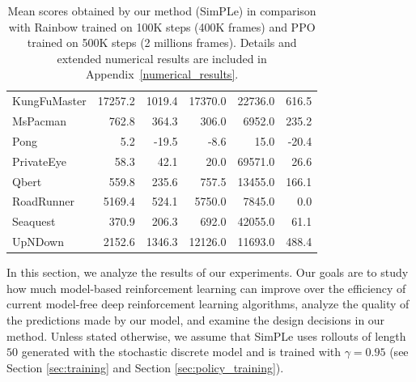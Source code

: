 \begin{table}
\begin{tabular}{l|r|r|r|r|r}
KungFuMaster   &  17257.2 &   1019.4 &  17370.0 &  22736.0 &   616.5 \\
MsPacman       &    762.8 &    364.3 &    306.0 &   6952.0 &   235.2 \\
Pong           &      5.2 &    -19.5 &     -8.6 &     15.0 &   -20.4 \\
PrivateEye     &     58.3 &     42.1 &     20.0 &  69571.0 &    26.6 \\
Qbert          &    559.8 &    235.6 &    757.5 &  13455.0 &   166.1 \\
RoadRunner     &   5169.4 &    524.1 &   5750.0 &   7845.0 &     0.0 \\
Seaquest       &    370.9 &    206.3 &    692.0 &  42055.0 &    61.1 \\
UpNDown        &   2152.6 &   1346.3 &  12126.0 &  11693.0 &   488.4 \\

\end{tabular}
\caption{Mean scores obtained by our method (SimPLe) in comparison with Rainbow trained on 100K steps (400K frames) and PPO trained on 500K steps (2 millions frames). Details and extended numerical results are included in Appendix~\ref{numerical_results}.}
\label{tab:shortNumericalResults}
\end{table}

In this section, we analyze the results of our experiments. Our goals are to study how much model-based reinforcement learning can improve over the efficiency of current model-free deep reinforcement learning algorithms, analyze the quality of the predictions made by our model, and examine the design decisions in our method. Unless stated otherwise, we assume that SimPLe uses rollouts of length $50$ generated with the stochastic discrete model and is trained with $\gamma=0.95$ (see Section \ref{sec:training} and Section \ref{sec:policy_training}). 

